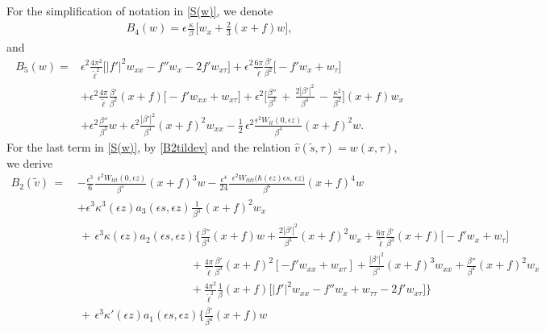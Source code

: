 \documentclass[10pt, reqno]{amsart}
\numberwithin{equation}{section}
\theoremstyle{definition}
\begin{document}
{\medskip
For the simplification of notation in \eqref{S(w)}, we denote
\begin{align} \label{new opreator B4}
 B_4(w)
 =\epsilon \frac{\kappa}{\, \beta\, } \Big[ w_x +\frac{2}{3} (x+f)w\Big],
\end{align}
and
\begin{align} \label{new opreator B5}
 B_5(w)
 =&\epsilon^2\frac{4\pi^2}{{\tilde\ell}^2}\Big[|f'|^2 w_{xx} -f''w_x -2f' w_{x\tau}\Big]
+
\epsilon^2\frac{6\pi}{{\tilde\ell}}\frac{\beta'} {\beta^2}\Big[- f' w_x +w_\tau\Big]
\nonumber\\[2mm]
&
+ \epsilon^2 \frac{4\pi}{{\tilde\ell}} \frac{\beta'}{\beta^2} (x+f)\big[- f' w_{xx} +w_{x\tau}\big]
+
\epsilon^2\Big[
\frac{\beta''}{\beta^3}\,+\,\frac{2|\beta'|^2}{\beta^4} \,-\,\frac{\kappa^2}{\beta^2} \Big] (x+f) w_{x}
\nonumber\\[2mm]
&+\epsilon^2\frac{\beta''}{\beta^3}w
+ \epsilon^2 \frac{|\beta'|^2}{\beta^4}(x+f)^2 w_{xx}
-\frac{1}{2}\, \epsilon^2\frac{\epsilon^2W_{tt}(0, \epsilon z)}{\beta^4} (x+f)^2 w.
\end{align}
For the last term in \eqref{S(w)}, by \eqref{B2tildev} and the relation $\hat v (\tilde s, \tau)=w(x, \tau)$, we derive
\begin{align}
 B_2 ({\tilde v})
 \,=\,& - \frac{\epsilon^3}{6} \frac{\, \, \epsilon^2 W_{ttt}(0, \epsilon z)}{\beta^5} (x+f)^3 w
 -\frac{\epsilon^4}{24} \frac{\, \, \epsilon^2 W_{tttt}\big(\hbar(\epsilon z)\epsilon s, \, \epsilon z\big)}{\beta^6} (x+f)^4w
\nonumber\\[2mm]
&
 +\epsilon^3 \kappa^3(\epsilon z) a_3(\epsilon s, \epsilon z) \frac{1}{\, \beta^3\, }(x+f)^2w_{x}
\nonumber\\[2mm]
&\,+\,
\epsilon^3 \kappa(\epsilon z) a_2(\epsilon s, \epsilon z)
\Bigg\{
\frac{\beta''} {\beta^4} (x+f) w
+\frac{2|\beta'|^2}{\beta^5} (x+f)^2 w_x
+\frac{ 6\pi}{ {\tilde\ell}}\frac{\beta'} {\beta^3} (x+f)\big[-f'w_x +w_\tau\big]
\nonumber\\[2mm]
&\qquad\qquad\qquad\qquad\qquad
+\frac{ 4\pi}{ {\tilde\ell}}\frac{\beta'} {\beta^3} (x+f)^2[- f' w_{xx} +w_{x\tau}]
+ \frac{|\beta'|^2}{\beta^5} (x+f)^3w_{xx}
+ \frac{\beta''}{\beta^4} (x+f)^2 w_{x}
\nonumber\\[2mm]
&\qquad\qquad\qquad\qquad\qquad
+\frac{ 4\pi^2} {{\tilde\ell}^2}\frac{1}{\beta} (x+f)\big[ |f'|^2 w_{xx} -f''w_x +w_{\tau\tau} -2f' w_{x\tau}\big]
\Bigg\}
\nonumber\\[2mm]
&\,+\,
\epsilon^3 \kappa'(\epsilon z)a_1(\epsilon s, \epsilon z)
\Bigg\{
\frac{\beta'}{\beta^4} (x+f)w

\end{align}}
\end{document}
